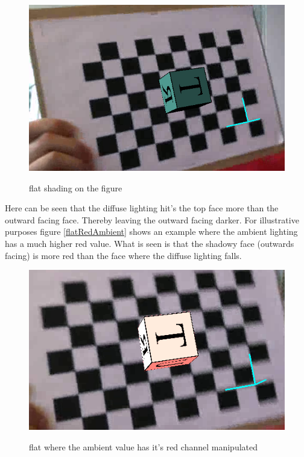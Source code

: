 \begin{figure}[!htbp]
    \includegraphics{pics/flat1.png}
    \label{fig:flatShading}
    \caption{flat shading on the figure}
\end{figure}

Here can be seen that the diffuse lighting hit's the top face more than the outward
facing face. Thereby leaving the outward facing darker. For illustrative purposes
figure \ref{flatRedAmbient} shows an example where the ambient lighting has a much
higher red value. What is seen is that the shadowy face (outwards facing) is more red 
than the face where the diffuse lighting falls. 

\begin{figure}[!htbp]
    \includegraphics{pics/flatRedAmbient.png}
    \label{fig:flatRedAmbient}
    \caption{flat where the ambient value has it's red channel manipulated}
\end{figure}

